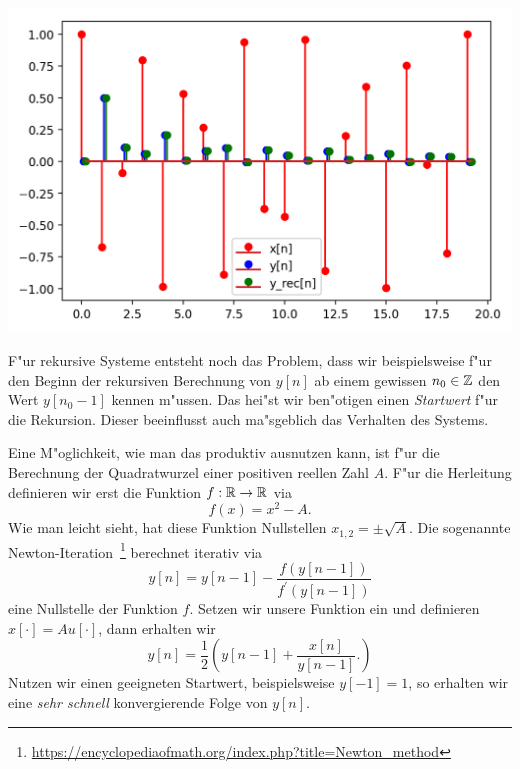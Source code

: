 \begin{listing}
    \noindent
    \begin{minipage}{0.49\textwidth}
        \strut\vspace*{-\baselineskip}\newline
        \inputminted[firstline=5,lastline=20]{python3}{code/cumulative_sum.py}
    \end{minipage}%
    \begin{minipage}{0.49\textwidth}
        \strut\vspace*{-\baselineskip}\newline
        \includegraphics[width=\textwidth]{code/cumulative_sum.png}
    \end{minipage}
    \label{py:cumulative_sum}
\end{listing}
%
%
F"ur rekursive Systeme entsteht noch das Problem, dass wir beispielsweise f"ur den Beginn der rekursiven Berechnung von $y[n]$ ab einem gewissen $n_0 \in \mathbb{Z}$ den Wert $y[n_0-1]$ kennen m"ussen.
Das hei"st wir ben"otigen einen \emph{Startwert} f"ur die Rekursion.
Dieser beeinflusst auch ma"sgeblich das Verhalten des Systems.

Eine M"oglichkeit, wie man das produktiv ausnutzen kann, ist f"ur die Berechnung der Quadratwurzel einer positiven reellen Zahl $A$.
F"ur die Herleitung definieren wir erst die Funktion $f : \mathbb{R} \rightarrow \mathbb{R}$ via
\[
f(x) = x^2 - A.
\]
Wie man leicht sieht, hat diese Funktion Nullstellen $x_{1,2} = \pm \sqrt{A}$.
Die sogenannte Newton-Iteration~\footnote{\url{https://encyclopediaofmath.org/index.php?title=Newton_method}} berechnet iterativ via
\[
y[n] = y[n-1] - \frac{f(y[n-1])}{f^\prime(y[n-1])}
\]
eine Nullstelle der Funktion $f$.
Setzen wir unsere Funktion ein und definieren $x[\cdot] = A u[\cdot]$, dann erhalten wir
\[
y[n] = \frac 12 \left(
    y[n-1] + \frac{x[n]}{y[n-1]}.
\right)
\]
Nutzen wir einen geeigneten Startwert, beispielsweise $y[-1] = 1$, so erhalten wir eine \emph{sehr schnell} konvergierende Folge von $y[n]$.

